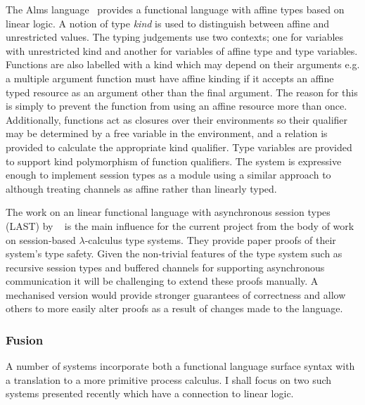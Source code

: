 The Alms language~\cite{Aldrich:2009} provides a functional language with
affine types based on linear logic. A notion of type \textit{kind} is used to
distinguish between affine and unrestricted values. The typing judgements use
two contexts; one for variables with unrestricted kind and another for
variables of affine type and type variables. Functions are also labelled with
a kind which may depend on their arguments e.g. a multiple argument function
must have affine kinding if it accepts an affine typed resource as an argument
other than the final argument. The reason for this is simply to prevent the
function from using an affine resource more than once. Additionally, functions
act as closures over their environments so their qualifier may be determined
by a free variable in the environment, and a relation is provided to calculate
the appropriate kind qualifier. Type variables are provided to support kind
polymorphism of function qualifiers. The system is expressive enough to
implement session types as a module using a similar approach to
\citeauthor{Gay:2010:LAST}~\cite{Gay:2010:LAST} although treating channels as
affine rather than linearly typed.


The work on an linear functional language with asynchronous session types
(LAST) by \citeauthor{Gay:2010:LAST}~\cite{Gay:2010:LAST} is the main
influence for the current project from the body of work on session-based
$\lambda$-calculus type systems. They provide paper proofs of their system's
type safety. Given the non-trivial features of the type system such as
recursive session types and buffered channels for supporting asynchronous
communication it will be challenging to extend these proofs manually. A
mechanised version would provide stronger guarantees of correctness and allow
others to more easily alter proofs as a result of changes made to the
language.

\subsubsection{Fusion}\label{sec:fusion}

A number of systems incorporate both a functional language surface syntax with
a translation to a more primitive process calculus. I shall focus on two such
systems presented recently which have a connection to linear logic.

